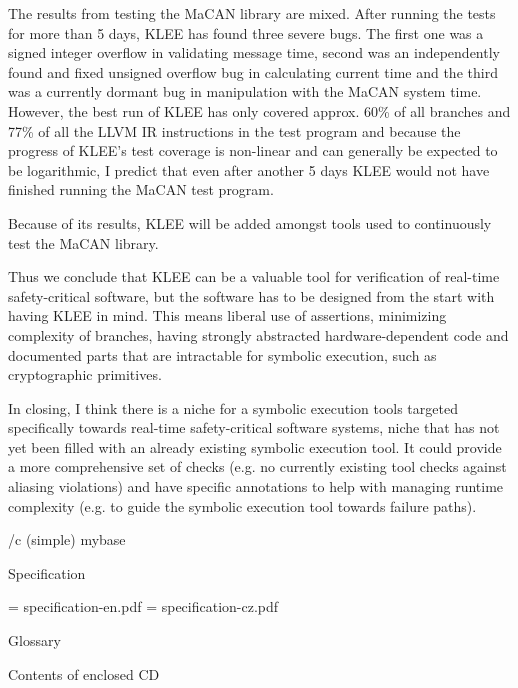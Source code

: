The results from testing the MaCAN library are mixed. After running the tests
for more than 5 days, KLEE has found three severe bugs. The first one was a
signed integer overflow in validating message time, second was an independently
found and fixed unsigned overflow bug in calculating current time and the third
was a currently dormant bug in manipulation with the MaCAN system time.
However, the best run of KLEE has only covered approx.
60\% of all branches and 77\% of all the LLVM IR instructions in the test
program and because the progress of KLEE's test coverage is non-linear and
can generally be expected to be logarithmic, I predict that even after another
5 days KLEE would not have finished running the MaCAN test program.

Because of its results, KLEE will be added amongst tools used to continuously
test the MaCAN library.

Thus we conclude that KLEE can be a valuable tool for verification of
real-time safety-critical software, but the software has to be designed from
the start with having KLEE in mind. This means liberal use of assertions,
minimizing complexity of branches, having strongly abstracted
hardware-dependent code and documented parts that are intractable for symbolic
execution, such as cryptographic primitives.

In closing, I think there is a niche for a symbolic execution tools targeted
specifically towards real-time safety-critical software systems, niche that has
not yet been filled with an already existing symbolic execution tool. It could
provide a more comprehensive set of checks (e.g. no currently existing tool
checks against aliasing violations) and have specific annotations to help with
managing runtime complexity (e.g. to guide the symbolic execution tool towards
failure paths).


\nextoddpage

\bibchap
\usebib/c (simple) mybase


\app Specification

\picw=\hsize
\cinspic specification-en.pdf
\vskip-2cm
\vfil\break
\picw=\hsize
\cinspic specification-cz.pdf
\nextoddpage


\app Glossary\par
\makeglos

\nextoddpage

\app Contents of enclosed CD

